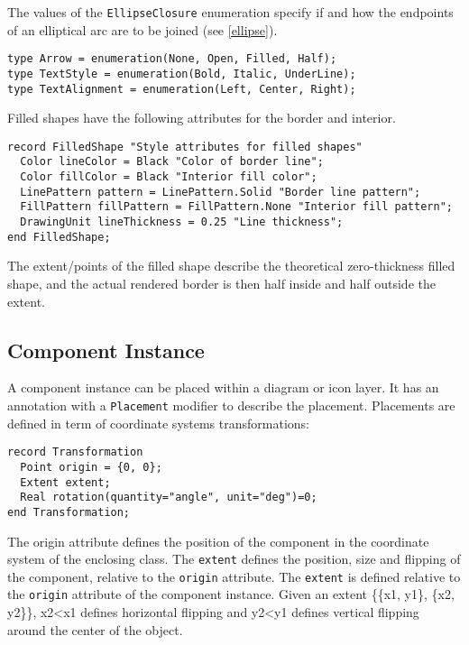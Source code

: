 The values of the \lstinline!EllipseClosure! enumeration specify if and how the
endpoints of an elliptical arc are to be joined (see \cref{ellipse}).

\begin{lstlisting}[language=modelica]
type Arrow = enumeration(None, Open, Filled, Half);
type TextStyle = enumeration(Bold, Italic, UnderLine);
type TextAlignment = enumeration(Left, Center, Right);
\end{lstlisting}
Filled shapes have the following attributes for the border and interior.

\begin{lstlisting}[language=modelica]
record FilledShape "Style attributes for filled shapes"
  Color lineColor = Black "Color of border line";
  Color fillColor = Black "Interior fill color";
  LinePattern pattern = LinePattern.Solid "Border line pattern";
  FillPattern fillPattern = FillPattern.None "Interior fill pattern";
  DrawingUnit lineThickness = 0.25 "Line thickness";
end FilledShape;
\end{lstlisting}
The extent/points of the filled shape describe the theoretical
zero-thickness filled shape, and the actual rendered border is then half
inside and half outside the extent.

\subsection{Component Instance}\label{component-instance}

A component instance can be placed within a diagram or icon layer. It
has an annotation with a \lstinline!Placement! modifier to describe the placement.
Placements are defined in term of coordinate systems transformations:
\begin{lstlisting}[language=modelica]
record Transformation
  Point origin = {0, 0};
  Extent extent;
  Real rotation(quantity="angle", unit="deg")=0;
end Transformation;
\end{lstlisting}
The origin attribute defines the position of the component in the
coordinate system of the enclosing class. The \lstinline!extent! defines the
position, size and flipping of the component, relative to the \lstinline!origin!
attribute. The \lstinline!extent! is defined relative to the \lstinline!origin! attribute of the
component instance. Given an extent \{\{x1, y1\}, \{x2, y2\}\},
x2\textless{}x1 defines horizontal flipping and y2\textless{}y1 defines
vertical flipping around the center of the object.

